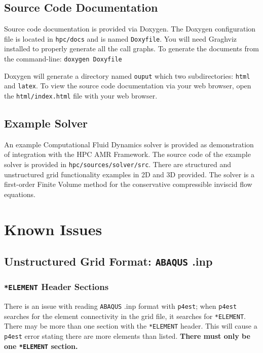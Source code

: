 \documentclass[11pt]{book}
\begin{document}
\section{Source Code Documentation}
Source code documentation is provided via Doxygen. The Doxygen configuration file is located in \texttt{hpc/docs} and is named \texttt{Doxyfile}. You will need Graghviz installed to properly generate all the call graphs. To generate the documents from the command-line: \texttt{doxygen Doxyfile}

Doxygen will generate a directory named \texttt{ouput} which two subdirectories: \texttt{html} and \texttt{latex}. To view the source code documentation via your web browser, open the \texttt{html/index.html} file with your web browser.

\section{Example Solver}
An example Computational Fluid Dynamics solver is provided as demonstration of integration with the HPC AMR Framework.
The source code of the example solver is provided in \texttt{hpc/sources/solver/src}. 
There are structured and unstructured grid functionality examples in 2D and 3D provided. 
The solver is a first-order Finite Volume method for the conservative compressible inviscid flow equations.




\chapter{Known Issues}
\section{Unstructured Grid Format: \texttt{ABAQUS} .inp}\label{abaqus-issue}
\subsection{\texttt{*ELEMENT} Header Sections}
There is an issue with reading \texttt{ABAQUS} .inp  format with \texttt{p4est}; 
when \texttt{p4est} searches for the element connectivity in the grid file, it 
searches for \texttt{*ELEMENT}. There may be more than one section with the 
\texttt{*ELEMENT} header. This will cause a \texttt{p4est} error stating there 
are more elements than listed. \textbf{There must only be one \texttt{*ELEMENT} section.}
\end{document}
